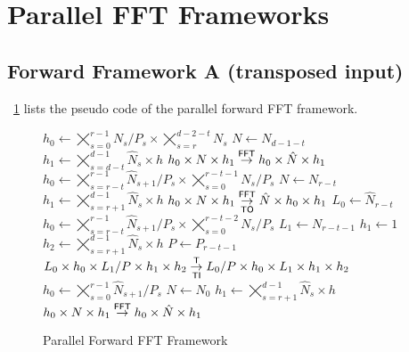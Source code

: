 




\section{Parallel FFT Frameworks}

\subsection{Forward Framework A (transposed input)}
\figurename{}~\ref{fig:fft_forw} lists the pseudo code of the parallel forward FFT framework.
\begin{figure}[ht]
  \begin{algorithmic}[1]
      \State $h_0 \gets \bigtimes_{s=0}^{r-1} N_s/P_s \times \bigtimes_{s=r}^{d-2-t} N_s$
      \State $N   \gets N_{d-1-t}$
      \State $h_1 \gets \bigtimes_{s=d-t}^{d-1} \hat N_s \times h$
      \State $h_0 \times N \times h_1 \overset{\textsf{FFT}}{\rightarrow} h_0 \times \hat N \times h_1$
    \EndFor
      \State $h_0 \gets \bigtimes_{s=r-t}^{r-1} \hat N_{s+1}/P_s \times \bigtimes_{s=0}^{r-t-1} N_s/P_s$
      \State $N   \gets N_{r-t}$
      \State $h_1 \gets \bigtimes_{s=r+1}^{d-1} \hat N_s \times h$
      \State $h_0 \times N \times h_1 \overset{\textsf{FFT}}{\underset{\textsf{TO}}{\rightarrow}} \hat N \times h_0 \times h_1$
      \State
      \State $L_0 \gets \hat N_{r-t}$
      \State $h_0 \gets \bigtimes_{s=r-t}^{r-1}\hat N_{s+1}/P_{s} \times \bigtimes_{s=0}^{r-t-2} N_s/P_s$
      \State $L_1 \gets N_{r-t-1}$
      \State $h_1 \gets 1$
      \State $h_2 \gets \bigtimes_{s=r+1}^{d-1} \hat N_s \times h$
      \State $P   \gets P_{r-t-1}$
      \State $L_0 \times h_0 \times L_1/P \times h_1 \times h_2\overset{\textsf{T}}{\underset{\textsf{TI}}{\rightarrow}} L_0/P \times h_0 \times L_1 \times h_1 \times h_2$
    \EndFor
    \State $h_0 \gets \bigtimes_{s=0}^{r-1}\hat N_{s+1}/P_s$
    \State $N   \gets N_0$
    \State $h_1 \gets \bigtimes_{s=r+1}^{d-1} \hat N_s \times h$
    \State $h_0 \times N \times h_1 \overset{\textsf{FFT}}{\rightarrow} h_0 \times \hat N \times h_1$
  \end{algorithmic}
  \caption{Parallel Forward FFT Framework}\label{fig:fft_forw}
\end{figure}

